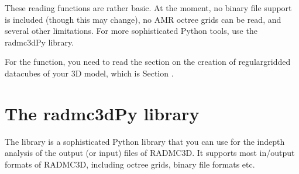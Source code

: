 \documentclass[letterpaper,10pt,english]{sphinxmanual}
\begin{document}
\begin{sphinxVerbatim}[commandchars=\\\{\}]
   
   
   
  
\PYG{p}{[}\PYG{p}{]}
  
\PYG{p}{[}\PYG{p}{]}
\end{sphinxVerbatim}

 These reading functions are rather basic. At the moment, no binary
file support is included (though this may change), no AMR octree grids can be
read, and several other limitations. For more sophisticated Python tools,
use the radmc3dPy library.

 For the  function, you need to read the section
on the creation of regular\sphinxhyphen{}gridded datacubes of your 3D model, which is
Section {\hyperref[\detokenize{toolsinside:sec-subbox}]{}}.


\section{The radmc3dPy library}
\label{\detokenize{pythontools:the-radmc3dpy-library}}
The  library is a sophisticated Python library that you
can use for the in\sphinxhyphen{}depth analysis of the output (or input) files of RADMC\sphinxhyphen{}3D.
It supports most in/output formats of RADMC\sphinxhyphen{}3D, including octree grids,
binary file formats etc.
\end{document}
